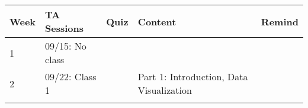 \documentclass[
]{book}
\begin{document}
\begin{longtable}[]{@{}lllll@{}}
\toprule
\begin{minipage}[b]{0.08\columnwidth}\raggedright
Week\strut
\end{minipage} & \begin{minipage}[b]{0.17\columnwidth}\raggedright
TA Sessions\strut
\end{minipage} & \begin{minipage}[b]{0.08\columnwidth}\raggedright
Quiz\strut
\end{minipage} & \begin{minipage}[b]{0.32\columnwidth}\raggedright
Content\strut
\end{minipage} & \begin{minipage}[b]{0.22\columnwidth}\raggedright
Remind\strut
\end{minipage}\tabularnewline
\midrule
\endhead
\begin{minipage}[t]{0.08\columnwidth}\raggedright
1\strut
\end{minipage} & \begin{minipage}[t]{0.17\columnwidth}\raggedright
09/15: No class\strut
\end{minipage} & \begin{minipage}[t]{0.08\columnwidth}\raggedright
\strut
\end{minipage} & \begin{minipage}[t]{0.32\columnwidth}\raggedright
\strut
\end{minipage} & \begin{minipage}[t]{0.22\columnwidth}\raggedright
\strut
\end{minipage}\tabularnewline
\begin{minipage}[t]{0.08\columnwidth}\raggedright
2\strut
\end{minipage} & \begin{minipage}[t]{0.17\columnwidth}\raggedright
09/22: Class 1\strut
\end{minipage} & \begin{minipage}[t]{0.08\columnwidth}\raggedright
\strut
\end{minipage} & \begin{minipage}[t]{0.32\columnwidth}\raggedright
Part 1: Introduction, Data Visualization\strut
\end{minipage} & \begin{minipage}[t]{0.22\columnwidth}\raggedright
\strut
\end{minipage}\tabularnewline
\begin{minipage}[t]{0.08\columnwidth}\raggedright

\end{minipage}
\end{longtable}
\end{document}
